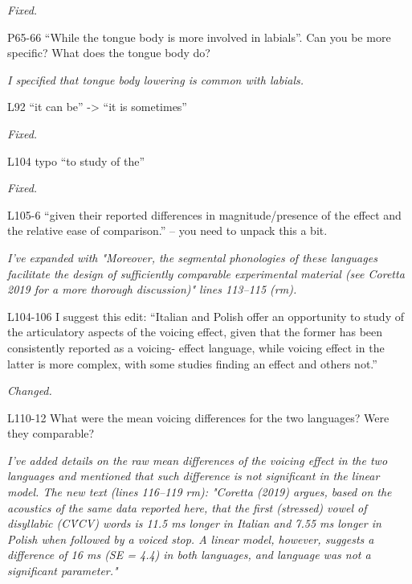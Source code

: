 \documentclass[]{article}
\begin{document}
\begin{adjustwidth}{1cm}{} \textit{
Fixed.
} \end{adjustwidth}

P65-66 ``While the tongue body is more involved in labials''. Can you be
more specific? What does the tongue body do?

\begin{adjustwidth}{1cm}{} \textit{
I specified that tongue body lowering is common with labials.
} \end{adjustwidth}

L92 ``it can be'' -\textgreater{} ``it is sometimes''

\begin{adjustwidth}{1cm}{} \textit{
Fixed.
} \end{adjustwidth}

L104 typo ``to study of the''

\begin{adjustwidth}{1cm}{} \textit{
Fixed.
} \end{adjustwidth}

L105-6 ``given their reported differences in magnitude/presence of the
effect and the relative ease of comparison.'' -- you need to unpack this
a bit.

\begin{adjustwidth}{1cm}{} \textit{
I've expanded with "Moreover, the segmental phonologies of these languages facilitate the design of sufficiently comparable experimental material (see Coretta 2019 for a more thorough discussion)" lines 113--115 (rm).
} \end{adjustwidth}

L104-106 I suggest this edit: ``Italian and Polish offer an opportunity
to study of the articulatory aspects of the voicing effect, given that
the former has been consistently reported as a voicing- effect language,
while voicing effect in the latter is more complex, with some studies
finding an effect and others not.''

\begin{adjustwidth}{1cm}{} \textit{
Changed.
} \end{adjustwidth}

L110-12 What were the mean voicing differences for the two languages?
Were they comparable?

\begin{adjustwidth}{1cm}{} \textit{
I've added details on the raw mean differences of the voicing effect in the two languages and mentioned that such difference is not significant in the linear model. The new text (lines 116--119 rm): "Coretta (2019) argues, based on the acoustics of the same data reported here, that the first (stressed) vowel of disyllabic (CV́CV) words is 11.5 ms longer in Italian and 7.55 ms longer in Polish when followed by a voiced stop. A linear model, however, suggests a difference of 16 ms (SE = 4.4) in both languages, and language was not a significant parameter."
} \end{adjustwidth}
\end{document}
